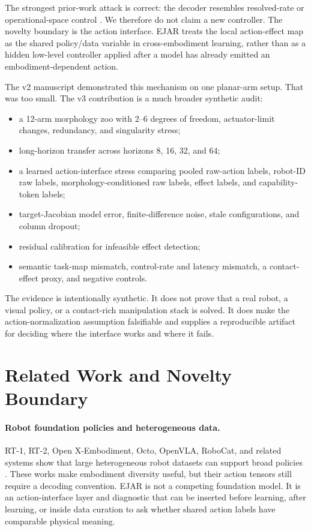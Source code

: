 \documentclass{article}
\begin{document}
The strongest prior-work attack is correct: the decoder resembles resolved-rate or operational-space control \citep{whitney1969resolved,khatib1987operational}. We therefore do not claim a new controller. The novelty boundary is the action interface. EJAR treats the local action-effect map as the shared policy/data variable in cross-embodiment learning, rather than as a hidden low-level controller applied after a model has already emitted an embodiment-dependent action.

The v2 manuscript demonstrated this mechanism on one planar-arm setup. That was too small. The v3 contribution is a much broader synthetic audit:
\begin{itemize}
\item a 12-arm morphology zoo with 2--6 degrees of freedom, actuator-limit changes, redundancy, and singularity stress;
\item long-horizon transfer across horizons 8, 16, 32, and 64;
\item a learned action-interface stress comparing pooled raw-action labels, robot-ID raw labels, morphology-conditioned raw labels, effect labels, and capability-token labels;
\item target-Jacobian model error, finite-difference noise, stale configurations, and column dropout;
\item residual calibration for infeasible effect detection;
\item semantic task-map mismatch, control-rate and latency mismatch, a contact-effect proxy, and negative controls.
\end{itemize}

The evidence is intentionally synthetic. It does not prove that a real robot, a visual policy, or a contact-rich manipulation stack is solved. It does make the action-normalization assumption falsifiable and supplies a reproducible artifact for deciding where the interface works and where it fails.

\section{Related Work and Novelty Boundary}

\paragraph{Robot foundation policies and heterogeneous data.}
RT-1, RT-2, Open X-Embodiment, Octo, OpenVLA, RoboCat, and related systems show that large heterogeneous robot datasets can support broad policies \citep{brohan2023rt1,brohan2023rt2,openx2023,octo2024,kim2024openvla,li2023robocat}. These works make embodiment diversity useful, but their action tensors still require a decoding convention. EJAR is not a competing foundation model. It is an action-interface layer and diagnostic that can be inserted before learning, after learning, or inside data curation to ask whether shared action labels have comparable physical meaning.
\end{document}
